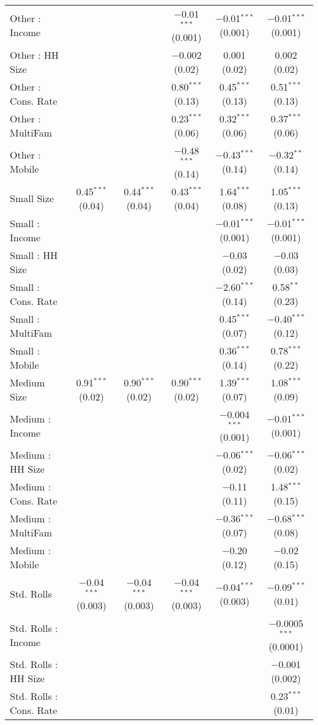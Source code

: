 \begin{table}[!htbp]
\begin{tabular}{@{\extracolsep{5pt}}lccccc}
  Other : Income &  &  & $-$0.01$^{***}$ (0.001) & $-$0.01$^{***}$ (0.001) & $-$0.01$^{***}$ (0.001) \\ 
  Other : HH Size &  &  & $-$0.002 (0.02) & 0.001 (0.02) & 0.002 (0.02) \\ 
  Other : Cons. Rate &  &  & 0.80$^{***}$ (0.13) & 0.45$^{***}$ (0.13) & 0.51$^{***}$ (0.13) \\ 
  Other : MultiFam &  &  & 0.23$^{***}$ (0.06) & 0.32$^{***}$ (0.06) & 0.37$^{***}$ (0.06) \\ 
  Other : Mobile &  &  & $-$0.48$^{***}$ (0.14) & $-$0.43$^{***}$ (0.14) & $-$0.32$^{**}$ (0.14) \\ 
  Small Size & 0.45$^{***}$ (0.04) & 0.44$^{***}$ (0.04) & 0.43$^{***}$ (0.04) & 1.64$^{***}$ (0.08) & 1.05$^{***}$ (0.13) \\ 
  Small : Income &  &  &  & $-$0.01$^{***}$ (0.001) & $-$0.01$^{***}$ (0.001) \\ 
  Small : HH Size &  &  &  & $-$0.03 (0.02) & $-$0.03 (0.03) \\ 
  Small : Cons. Rate &  &  &  & $-$2.60$^{***}$ (0.14) & 0.58$^{**}$ (0.23) \\ 
  Small : MultiFam &  &  &  & 0.45$^{***}$ (0.07) & $-$0.40$^{***}$ (0.12) \\ 
  Small : Mobile &  &  &  & 0.36$^{***}$ (0.14) & 0.78$^{***}$ (0.22) \\ 
  Medium Size & 0.91$^{***}$ (0.02) & 0.90$^{***}$ (0.02) & 0.90$^{***}$ (0.02) & 1.39$^{***}$ (0.07) & 1.08$^{***}$ (0.09) \\ 
  Medium : Income &  &  &  & $-$0.004$^{***}$ (0.001) & $-$0.01$^{***}$ (0.001) \\ 
  Medium : HH Size &  &  &  & $-$0.06$^{***}$ (0.02) & $-$0.06$^{***}$ (0.02) \\ 
  Medium : Cons. Rate &  &  &  & $-$0.11 (0.11) & 1.48$^{***}$ (0.15) \\ 
  Medium : MultiFam &  &  &  & $-$0.36$^{***}$ (0.07) & $-$0.68$^{***}$ (0.08) \\ 
  Medium : Mobile &  &  &  & $-$0.20 (0.12) & $-$0.02 (0.15) \\ 
  Std. Rolls & $-$0.04$^{***}$ (0.003) & $-$0.04$^{***}$ (0.003) & $-$0.04$^{***}$ (0.003) & $-$0.04$^{***}$ (0.003) & $-$0.09$^{***}$ (0.01) \\ 
  Std. Rolls : Income &  &  &  &  & $-$0.0005$^{***}$ (0.0001) \\ 
  Std. Rolls : HH Size &  &  &  &  & $-$0.001 (0.002) \\ 
  Std. Rolls : Cons. Rate &  &  &  &  & 0.23$^{***}$ (0.01) \\ 

\end{tabular}
\end{table}
